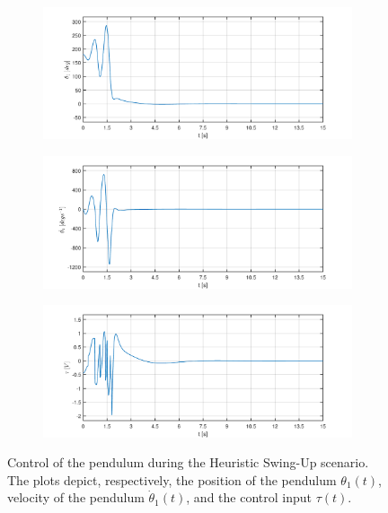 \begin{figure}[H]
	\centering
	\begin{subfigure}
		\centering
		\includegraphics[scale=0.6]{images/Hswing/pend.pdf}  
	\end{subfigure}
	\begin{subfigure}
		\centering
		\includegraphics[scale=0.6]{images/Hswing/dpend.pdf}  
	\end{subfigure}
	\begin{subfigure}
		\centering
		\includegraphics[scale=0.6]{images/Hswing/control.pdf}  
	\end{subfigure}
	\caption{Control of the pendulum during the Heuristic Swing-Up scenario. The plots depict, respectively, the position of the pendulum $\theta_1(t)$, velocity of the pendulum $\dot{\theta}_1(t)$, and the control input $\tau(t)$.}
	\label{combo1}
\end{figure}

